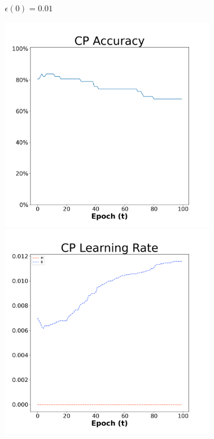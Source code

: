 \begin{figure}[H]
\begin{subfigure}{0.3\textwidth}
  \caption{$\epsilon(0)=0.01$}
\end{subfigure}\hfil %
\begin{subfigure}{0.3\textwidth}
  \includegraphics[width=\linewidth]{images/exper1/breast/CP_0.03_acc.png}
  \includegraphics[width=\linewidth]{images/exper1/breast/CP_0.03_lr.png}

\end{subfigure}
\end{figure}
